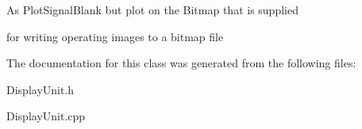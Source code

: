 As Plot\+Signal\+Blank but plot on the Bitmap that is supplied
\begin{DoxyItemize}
\item for writing operating images to a bitmap file 
\end{DoxyItemize}

The documentation for this class was generated from the following files\+:\begin{DoxyCompactItemize}
\item 
Display\+Unit.\+h\item 
Display\+Unit.\+cpp\end{DoxyCompactItemize}
